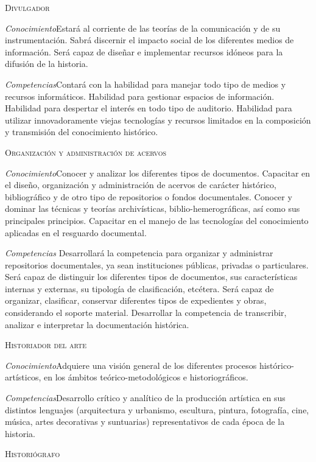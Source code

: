 \begin{scriptsize}
\begin{framed}
\textsc{Divulgador} 

\textit{Conocimiento}\quad Estará 
al corriente de las teorías de la comunicación y de su instrumentación. 
Sabrá discernir el impacto social de los diferentes medios de 
información. Será capaz de diseñar e implementar recursos idóneos para 
la difusión de la historia. 

\textit{Competencias}\quad  Contará con la habilidad para manejar todo 
tipo de medios y recursos 
informáticos. Habilidad para gestionar espacios de información. 
Habilidad para despertar el interés en todo tipo de auditorio. 
Habilidad para utilizar innovadoramente viejas tecnologías y recursos 
limitados en la composición y transmisión del conocimiento histórico.  
\newpage

\textsc{Organización y administración de acervos}

\textit{Conocimiento}\quad Conocer y analizar los diferentes 
tipos de documentos. Capacitar en el diseño, organización y 
administración de acervos de carácter histórico, bibliográfico y de 
otro tipo de repositorios o fondos documentales. Conocer y dominar las 
técnicas y teorías archivísticas, biblio-hemerográficas, así como sus 
principales principios. Capacitar en el manejo de las tecnologías del 
conocimiento aplicadas en el resguardo documental.  

\textit{Competencias }\quad Desarrollará la competencia para organizar y 
administrar repositorios documentales, ya sean instituciones públicas, 
privadas o particulares. Será capaz de distinguir los diferentes tipos 
de documentos, sus características internas y externas, su tipología de 
clasificación, etcétera. Será capaz de organizar, clasificar, conservar 
diferentes tipos de expedientes y obras, considerando el soporte 
material.  Desarrollar la competencia de transcribir, analizar e 
interpretar la documentación histórica.  

\textsc{Historiador del arte} 

\textit{Conocimiento}\quad Adquiere una 
visión general de los diferentes procesos histórico-artísticos, en los 
ámbitos teórico-metodológicos e historiográficos. 

\textit{Competencias}\quad Desarrollo crítico y analítico de la producción 
artística en sus distintos lenguajes (arquitectura y urbanismo, 
escultura, pintura, fotografía, cine, música, artes decorativas y 
suntuarias) representativos de cada época de la historia.  
\newpage

\textsc{Historiógrafo} 


\end{framed}
\end{scriptsize}
